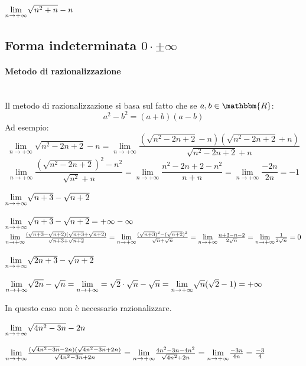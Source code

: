 \documentclass[12pt]{report}
\newcounter{exercise}
\begin{document}
	\begin{assignment}{}{}
		$\mathlarger{\lim_{n \to +\infty}}\sqrt{n^2+n}- n$
	\end{assignment}
	\subsection{Forma indeterminata $0 \cdot \pm\infty$}
	\paragraph{Metodo di razionalizzazione} \quad \\
	Il metodo di razionalizzazione si basa sul fatto che se $a, b \in \mathbbm{R}$:
	\[
	a^2 - b^2 = (a + b)(a - b)
	\]
	Ad esempio:
	\[
	\lim_{n \to +\infty}\sqrt{n^2 - 2n + 2} - n=\lim_{n \to +\infty}\frac{(\sqrt{n^2 - 2n + 2} - n)(\sqrt{n^2 - 2n + 2} + n)}{\sqrt{n^2 - 2n + 2} + n}
	\]
	\[
	\lim_{n \to +\infty}\frac{(\sqrt{n^2 - 2n + 2})^2 - n^2}{\sqrt{n^2} + n} = \lim_{n \to +\infty}\frac{n^2 -2n + 2 -n^2}{n + n} = \lim_{n \to +\infty}\frac{-2n}{2n}=-1
	\]
	\begin{assignment}{}{}
		$\mathlarger{\lim_{n \to +\infty}}\sqrt{n + 3}-\sqrt{n + 2}$
		\begin{exercise}{}{}
			$\mathlarger{\lim_{n \to +\infty}}\sqrt{n + 3}-\sqrt{n + 2}=+\infty - \infty$ \\
			$\mathlarger{\lim_{n \to +\infty}}\frac{(\sqrt{n + 3} - \sqrt{n + 2})(\sqrt{n + 3} + \sqrt{n + 2})}{\sqrt{n + 3} + \sqrt{n + 2}}=\mathlarger{\lim_{n \to +\infty}}\frac{(\sqrt{n+3})^2 - (\sqrt{n + 2})^2}{\sqrt{n} + \sqrt{n}} = \mathlarger{\lim_{n \to +\infty}}\frac{n + 3 -n - 2}{2\sqrt{n}} = \mathlarger{\lim_{n \to +\infty}}\frac{1}{2\sqrt{n}}=0$
		\end{exercise}
	\end{assignment}
	\begin{assignment}{}{}
		$\mathlarger{\lim_{n \to +\infty}}\sqrt{2n + 3} -\sqrt{n + 2}$
		\begin{exercise}{}{}
			$\mathlarger{\lim_{n \to +\infty}}\sqrt{2n} - \sqrt{n} = \mathlarger{\lim_{n \to +\infty}} = \sqrt{2}\cdot \sqrt{n} - \sqrt{n} = \mathlarger{\lim_{n \to +\infty}}\sqrt{n}(\sqrt{2} - 1) = +\infty$
		\end{exercise}
		In questo caso non è necessario razionalizzare.
	\end{assignment}
	\begin{assignment}{}{}
		$\mathlarger{\lim_{n \to +\infty}}\sqrt{4n^2 - 3n} - 2n$
		\begin{exercise}{}{}
			$\mathlarger{\lim_{n \to +\infty}}\frac{(\sqrt{4n^2-3n}-2n)(\sqrt{4n^2 - 3n} + 2n)}{\sqrt{4n^2 - 3n} + 2n} = \mathlarger{\lim_{n \to +\infty}}\frac{4n^2 -3n -4n^2}{\sqrt{4n^2} + 2n} = \mathlarger{\lim_{n \to +\infty}}\frac{-3n}{4n}=\frac{-3}{4}$
		\end{exercise}
	\end{assignment}
\end{document}
